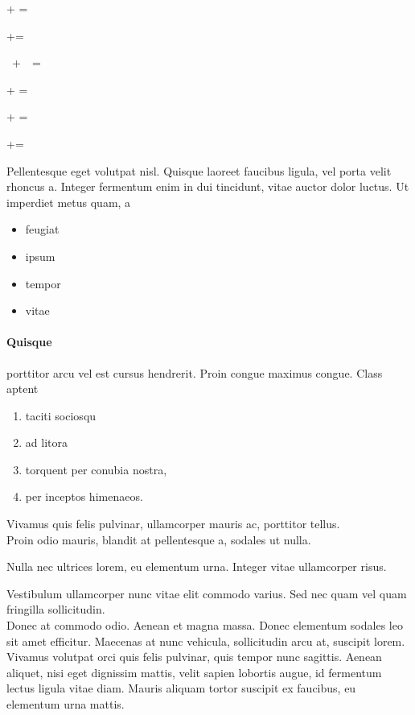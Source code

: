 \textonehalf + \textonequarter = \textthreequarters


\textonehalf+\textonequarter=\textthreequarters


\textonehalf~+~\textonequarter~=~\textthreequarters


\textonehalf  +         \textonequarter  =     \textthreequarters


{\textonehalf} + {\textonequarter} = {\textthreequarters}

{\textonehalf}+{\textonequarter}={\textthreequarters}


Pellentesque eget volutpat nisl. Quisque laoreet faucibus ligula, vel porta velit rhoncus a. Integer fermentum enim in dui tincidunt, vitae auctor dolor luctus. Ut imperdiet metus quam, a 

\begin{itemize}
 \item feugiat
 \item ipsum
 \item tempor 
 \item vitae
\end{itemize}

\paragraph{Quisque}
porttitor arcu vel est cursus hendrerit. Proin congue maximus congue. Class aptent 
\begin{enumerate}
 \item taciti sociosqu
 \item  ad litora
 \item torquent per conubia nostra, 
 \item  per inceptos himenaeos. 
\end{enumerate}


Vivamus quis felis pulvinar, ullamcorper mauris ac, porttitor tellus.\\
Proin odio mauris, blandit at pellentesque a, sodales ut nulla.

Nulla nec ultrices lorem, eu elementum urna. Integer vitae ullamcorper risus. 

\noindent
Vestibulum ullamcorper nunc vitae elit commodo varius. Sed nec quam vel quam fringilla sollicitudin.\\
Donec at commodo odio. Aenean et magna massa. Donec elementum sodales leo sit amet efficitur. Maecenas at nunc vehicula, sollicitudin arcu at, suscipit lorem. Vivamus volutpat orci quis felis pulvinar, quis tempor nunc sagittis. Aenean aliquet, nisi eget dignissim mattis, velit sapien lobortis augue, id fermentum lectus ligula vitae diam. Mauris aliquam tortor suscipit ex faucibus, eu elementum urna mattis. 


